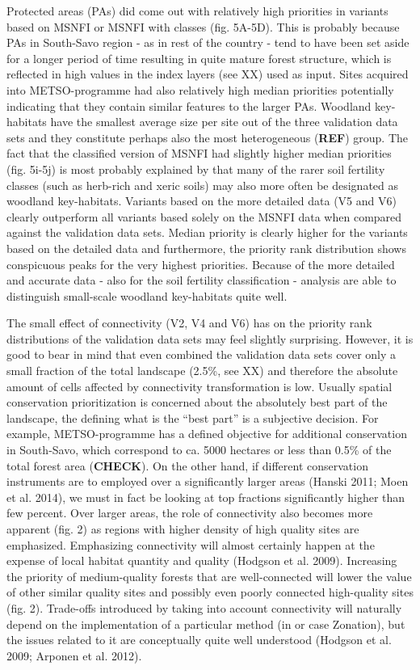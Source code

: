 \documentclass[]{article}
\begin{document}
Protected areas (PAs) did come out with relatively high priorities in
variants based on MSNFI or MSNFI with classes (fig. 5A-5D). This is
probably because PAs in South-Savo region - as in rest of the country -
tend to have been set aside for a longer period of time resulting in
quite mature forest structure, which is reflected in high values in the
index layers (see XX) used as input. Sites acquired into METSO-programme
had also relatively high median priorities potentially indicating that
they contain similar features to the larger PAs. Woodland key-habitats
have the smallest average size per site out of the three validation data
sets and they constitute perhaps also the most heterogeneous
(\textbf{REF}) group. The fact that the classified version of MSNFI had
slightly higher median priorities (fig. 5i-5j) is most probably
explained by that many of the rarer soil fertility classes (such as
herb-rich and xeric soils) may also more often be designated as woodland
key-habitats. Variants based on the more detailed data (V5 and V6)
clearly outperform all variants based solely on the MSNFI data when
compared against the validation data sets. Median priority is clearly
higher for the variants based on the detailed data and furthermore, the
priority rank distribution shows conspicuous peaks for the very highest
priorities. Because of the more detailed and accurate data - also for
the soil fertility classification - analysis are able to distinguish
small-scale woodland key-habitats quite well.

The small effect of connectivity (V2, V4 and V6) has on the priority
rank distributions of the validation data sets may feel slightly
surprising. However, it is good to bear in mind that even combined the
validation data sets cover only a small fraction of the total landscape
(2.5\%, see XX) and therefore the absolute amount of cells affected by
connectivity transformation is low. Usually spatial conservation
prioritization is concerned about the absolutely best part of the
landscape, the defining what is the ``best part'' is a subjective
decision. For example, METSO-programme has a defined objective for
additional conservation in South-Savo, which correspond to ca. 5000
hectares or less than 0.5\% of the total forest area (\textbf{CHECK}).
On the other hand, if different conservation instruments are to employed
over a significantly larger areas (Hanski 2011; Moen et al. 2014), we
must in fact be looking at top fractions significantly higher than few
percent. Over larger areas, the role of connectivity also becomes more
apparent (fig. 2) as regions with higher density of high quality sites
are emphasized. Emphasizing connectivity will almost certainly happen at
the expense of local habitat quantity and quality (Hodgson et al. 2009).
Increasing the priority of medium-quality forests that are
well-connected will lower the value of other similar quality sites and
possibly even poorly connected high-quality sites (fig. 2). Trade-offs
introduced by taking into account connectivity will naturally depend on
the implementation of a particular method (in or case Zonation), but the
issues related to it are conceptually quite well understood (Hodgson et
al. 2009; Arponen et al. 2012).
\end{document}
